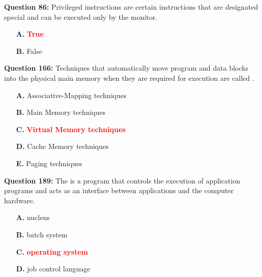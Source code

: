 \documentclass[12pt,a4paper]{article}
\begin{document}
\vspace{0.5cm}

\vspace{0.5cm}

\textbf{Question 86:} Privileged instructions are certain instructions that are designated special and can be executed only by the monitor.

\begin{itemize}
    \item[\textbf{A.}] \textcolor{red}{\textbf{True}}
    \item[\textbf{B.}] False
\end{itemize}

\vspace{0.5cm}

\vspace{0.5cm}

\textbf{Question 166:} Techniques that automatically move program and data blocks into the physical main memory when they are required for execution are called \underline{\hspace{1.5cm}}.

\begin{itemize}
    \item[\textbf{A.}] Associative-Mapping techniques
    \item[\textbf{B.}] Main Memory techniques
    \item[\textbf{C.}] \textcolor{red}{\textbf{Virtual Memory techniques}}
    \item[\textbf{D.}] Cache Memory techniques
    \item[\textbf{E.}] Paging techniques
\end{itemize}

\vspace{0.5cm}

\vspace{0.5cm}

\textbf{Question 189:} The \underline{\hspace{1.5cm}} is a program that controls the execution of application programs and acts as an interface between applications and the computer hardware.

\begin{itemize}
    \item[\textbf{A.}] nucleus
    \item[\textbf{B.}] batch system
    \item[\textbf{C.}] \textcolor{red}{\textbf{operating system}}
    \item[\textbf{D.}] job control language
\end{itemize}
\end{document}
